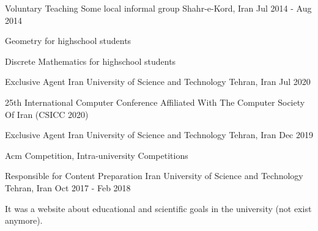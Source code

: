 

\begin{cventries}
    
    
    \cventry
    {Voluntary Teaching} %
    {Some local informal group} %
    {Shahr-e-Kord, Iran} %
    {Jul 2014 - Aug 2014} %
    {
      \begin{cvitems} %
        \item Geometry for highschool students
        \item Discrete Mathematics for highschool students
      \end{cvitems}
    }
    
    \cventry
    {Exclusive Agent} %
    {Iran University of Science and Technology} %
    {Tehran, Iran} %
    {Jul 2020} %
    {
      \begin{cvitems} %
        25th International Computer Conference Affiliated With The Computer \newline Society Of Iran (CSICC 2020)
      \end{cvitems}
    }
    
     \cventry
    {Exclusive Agent} %
    {Iran University of Science and Technology} %
    {Tehran, Iran} %
    {Dec 2019} %
    {
      \begin{cvitems} %
        Acm Competition, Intra-university Competitions
      \end{cvitems}
    }
    
    \cventry
    {Responsible for Content Preparation} %
    {Iran University of Science and Technology} %
    {Tehran, Iran} %
    {Oct 2017 - Feb 2018} %
    {
      \begin{cvitems} %
        It was a website about educational and scientific goals in the \newline university (not exist anymore).
      \end{cvitems}
    }
    
\end{cventries}